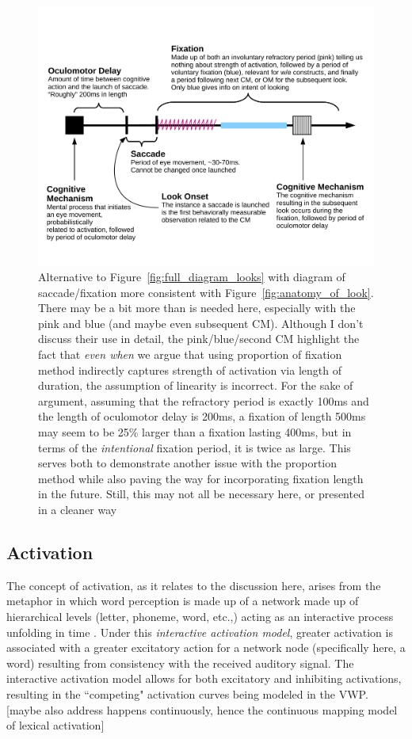 \documentclass{article}
\begin{document}
\begin{figure}
\centering
\includegraphics[scale=0.5]{what_is_a_look.pdf}
\caption{Alternative to Figure~\ref{fig:full_diagram_looks} with diagram of saccade/fixation more consistent with Figure~\ref{fig:anatomy_of_look}. There may be a bit more than is needed here, especially with the pink and blue (and maybe even subsequent CM). Although I don't discuss their use in detail, the pink/blue/second CM highlight the fact that \textit{even when} we argue that using proportion of fixation method indirectly captures strength of activation via length of duration, the assumption of linearity is incorrect. For the sake of argument, assuming that the refractory period is exactly 100ms and the length of oculomotor delay is 200ms, a fixation of length 500ms may seem to be 25\% larger than a fixation lasting 400ms, but in terms of the \textit{intentional} fixation period, it is twice as large. This serves both to demonstrate another issue with the proportion method while also paving the way for incorporating fixation length in the future. Still, this may not all be necessary here, or presented in a cleaner way} 
\label{fig:whats_in_a_look}
\end{figure}

\subsection{Activation}

The concept of activation, as it relates to the discussion here, arises from the metaphor in which word perception is made up of a network made up of hierarchical levels (letter, phoneme, word, etc.,) acting as an interactive process unfolding in time \cite{McClelland1981}. Under this \textit{interactive activation model}, greater activation is associated with a greater excitatory action for a network node (specifically here, a word) resulting from consistency with the received auditory signal. The interactive activation model allows for both excitatory and inhibiting activations, resulting in the ``competing" activation curves being modeled in the VWP. [maybe also address happens continuously, hence the continuous mapping model of lexical activation]
\end{document}
